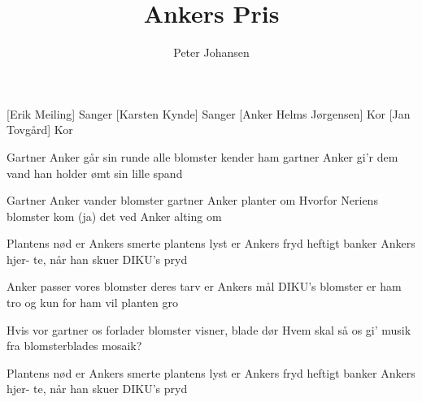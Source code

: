 \documentclass[a4paper,11pt]{article}
\title{Ankers Pris}
\author{Peter Johansen}
\begin{document}
\maketitle

\begin{roles}
[Erik Meiling] Sanger
[Karsten Kynde] Sanger
[Anker Helms Jørgensen] Kor
[Jan Tovgård] Kor
\end{roles}

\begin{song}
  Gartner Anker går sin runde
  alle blomster kender ham
  gartner Anker gi'r dem vand
  han holder ømt sin lille spand

  Gartner Anker vander blomster
  gartner Anker planter om
  Hvorfor Neriens blomster kom
  (ja) det ved Anker alting om

  Plantens nød er Ankers smerte
  plantens lyst er Ankers fryd
  heftigt banker Ankers hjer-
  te, når han skuer DIKU's pryd

  Anker passer vores blomster
  deres tarv er Ankers mål
  DIKU's blomster er ham tro
  og kun for ham vil planten gro

  Hvis vor gartner os forlader
  blomster visner, blade dør
  Hvem skal så os gi' musik
  fra blomsterblades mosaik?

  Plantens nød er Ankers smerte
  plantens lyst er Ankers fryd
  heftigt banker Ankers hjer-
  te, når han skuer DIKU's pryd
\end{song}
\end{document}

